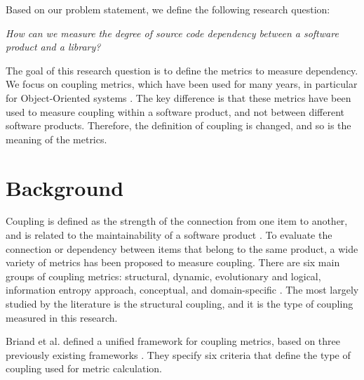 \documentclass[a4paper]{article}
\begin{document}
Based on our problem statement, we define the following research question:

\begin{description}[noitemsep,leftmargin=*]
  \item [\textbf{RQ1:}] \textit{How can we measure the degree of source code dependency between a software product and a library?}

  The goal of this research question is to define the metrics to measure dependency. We focus on coupling metrics, which have been used for many years, in particular for Object-Oriented systems \cite{briand1999unified}. The key difference is that these metrics have been used to measure coupling within a software product, and not between different software products. Therefore, the definition of coupling is changed, and so is the meaning of the metrics.

\end{description}

\section{Background}\label{section:Background}
Coupling is defined as the strength of the connection from one item to another, and is related to the maintainability of a software product \cite{gupta2009package}. To evaluate the connection or dependency between items that belong to the same product, a wide variety of metrics has been proposed to measure coupling.
There are six main groups of coupling metrics: structural, dynamic, evolutionary and logical, information entropy approach, conceptual, and domain-specific  \cite{poshyvanyk2006conceptual}. The most largely studied by the literature is the structural coupling, and it is the type of coupling measured in this research.

Briand et al. \cite{briand1999unified} defined a unified framework for coupling metrics, based on three previously existing frameworks \cite{eder1994coupling,hitz1995measuring,briand1997investigation}. They specify six criteria that define the type of coupling used for metric calculation.
\end{document}
